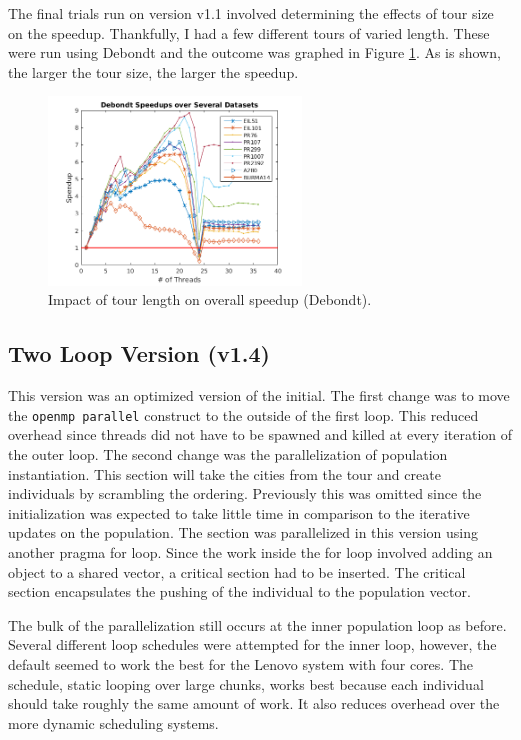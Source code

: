\documentclass[10pt,letterpaper]{article}
\begin{document}
The final trials run on version v1.1 involved determining the effects of tour size on the speedup. Thankfully, I had a few different tours of varied length. These were run using Debondt and the outcome was graphed in Figure \ref{fig:tours}. As is shown, the larger the tour size, the larger the speedup.

\begin{figure}
\centering
\includegraphics[width=0.6\textwidth]{../img/dataset_speedups.png}
\caption{Impact of tour length on overall speedup (Debondt).}
\label{fig:tours}
\end{figure}


\subsection{Two Loop Version (v1.4)}
This version was an optimized version of the initial. The first change was to move the \texttt{openmp parallel} construct to the outside of the first loop. This reduced overhead since threads did not have to be spawned and killed at every iteration of the outer loop. The second change was the parallelization of population instantiation. This section will take the cities from the tour and create individuals by scrambling the ordering. Previously this was omitted since the initialization was expected to take little time in comparison to the iterative updates on the population. The section was parallelized in this version using another pragma for loop. Since the work inside the for loop involved adding an object to a shared vector, a critical section had to be inserted. The critical section encapsulates the pushing of the individual to the population vector.

The bulk of the parallelization still occurs at the inner population loop as before. Several different loop schedules were attempted for the inner loop, however, the default seemed to work the best for the Lenovo system with four cores. The schedule, static looping over large chunks, works best because each individual should take roughly the same amount of work. It also reduces overhead over the more dynamic scheduling systems.
\end{document}
